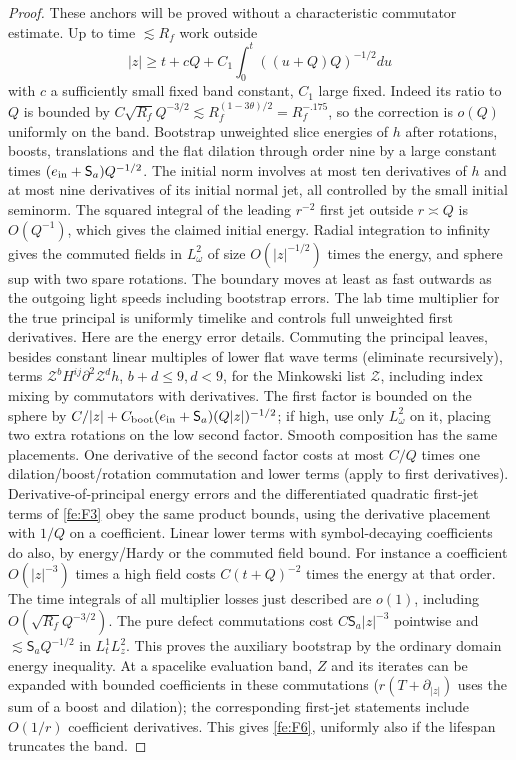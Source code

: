 \begin{proof}
These anchors will be proved without a characteristic commutator estimate.
Up to time \(\lesssim R_f\) work outside
\begin{equation*}
|z|\ge t+cQ+C_1\int_0^t ((u+Q)Q)^{-1/2}du
\end{equation*}
with \(c\) a sufficiently small fixed band constant, \(C_1\) large fixed. Indeed its ratio to $Q$ is bounded by
$C\sqrt{R_f}Q^{-3/2}\lesssim R_f^{(1-3\theta)/2}=R_f^{-.175}$,
so the correction is $o(Q)$ uniformly on the band. Bootstrap unweighted slice energies of \(h\) after rotations, boosts, translations and the flat dilation through order nine by a large constant times \((e_{\rm in}+\mathsf S_a) Q^{-1/2}\). The initial norm involves at most ten derivatives of $h$ and at most
nine derivatives of its initial normal jet, all controlled by the small
initial seminorm.  The squared integral of the leading
$r^{-2}$ first jet outside $r\asymp Q$ is $O(Q^{-1})$, which gives the
claimed initial energy. Radial integration to infinity gives the commuted fields in \(L^2_\omega\) of size \(O(|z|^{-1/2})\) times the energy, and sphere sup with two spare rotations. The boundary moves at least as fast outwards as the outgoing light speeds including bootstrap errors. The lab time multiplier for the true principal is uniformly timelike and controls full unweighted first derivatives. Here are the energy error details. Commuting the principal leaves, besides constant linear multiples of lower flat wave terms (eliminate recursively), terms \(\mathcal Z^b H^{ij}\partial^2\mathcal Z^d h\), \(b+d\le9,d<9\), for the Minkowski list \(\mathcal Z\), including index mixing by commutators with derivatives. The first factor is bounded on the sphere by \(C/|z|+C_{\rm boot}(e_{\rm in}+\mathsf S_a)(Q|z|)^{-1/2}\); if high, use only \(L^2_\omega\) on it, placing two extra rotations on the low second factor. Smooth composition has the same placements. One derivative of the second factor costs at most \(C/Q\) times one dilation/boost/rotation commutation and lower terms (apply to first derivatives). Derivative-of-principal energy errors and the differentiated quadratic first-jet terms of \eqref{fe:F3} obey the same product bounds, using the derivative placement with \(1/Q\) on a coefficient. Linear lower terms with symbol-decaying coefficients do also, by energy/Hardy or the commuted field bound. For instance a coefficient \(O(|z|^{-3})\) times a high field costs \(C(t+Q)^{-2}\) times the energy at that order. The time integrals of all multiplier losses just described are \(o(1)\), including \(O(\sqrt{R_f}Q^{-3/2})\). The pure defect commutations cost \(C\mathsf S_a |z|^{-3}\) pointwise and \(\lesssim\mathsf S_a Q^{-1/2}\) in \(L^1_t L^2_z\). This proves the auxiliary bootstrap by the ordinary domain energy inequality. At a spacelike evaluation band, \(Z\) and its iterates can be expanded with bounded coefficients in these commutations (\(r(T+\partial_{|z|})\) uses the sum of a boost and dilation); the corresponding first-jet statements include \(O(1/r)\) coefficient derivatives. This gives \eqref{fe:F6}, uniformly also if the lifespan truncates the band.
\end{proof}

